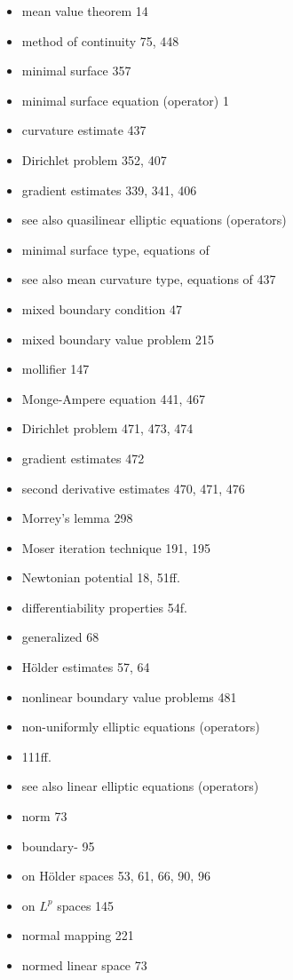 \begin{itemize}
\item[] mean value theorem \hfill 14
\item[] method of continuity \hfill 75, 448
\item[] minimal surface \hfill 357
\item[] minimal surface equation (operator) \hfill 1
\item[] \qquad curvature estimate \hfill 437
\item[] \qquad Dirichlet problem \hfill 352, 407
\item[] \qquad gradient estimates \hfill 339, 341, 406
\item[] \quad see also quasilinear elliptic equations (operators)
\item[] minimal surface type, equations of
\item[] \quad see also mean curvature type, equations of \hfill 437
\item[] mixed boundary condition \hfill 47
\item[] mixed boundary value problem \hfill 215
\item[] mollifier \hfill 147
\item[] Monge-Ampere equation \hfill 441, 467
\item[] \qquad Dirichlet problem \hfill 471, 473, 474
\item[] \qquad gradient estimates \hfill 472
\item[] \qquad second derivative estimates \hfill 470, 471, 476
\item[] Morrey's lemma \hfill 298
\item[] Moser iteration technique \hfill 191, 195

\item[] Newtonian potential \hfill 18, 51ff.
\item[] \qquad differentiability properties \hfill 54f.
\item[] \qquad generalized \hfill 68
\item[] \qquad Hölder estimates \hfill 57, 64
\item[] nonlinear boundary value problems \hfill 481
\item[] non-uniformly elliptic equations (operators)
\item[] \qquad 111ff.
\item[] \quad see also linear elliptic equations (operators)
\item[] norm \hfill 73
\item[] \qquad boundary- \hfill 95
\item[] \qquad on Hölder spaces \hfill 53, 61, 66, 90, 96
\item[] \qquad on $L^p$ spaces \hfill 145
\item[] normal mapping \hfill 221
\item[] normed linear space \hfill 73


\end{itemize}
